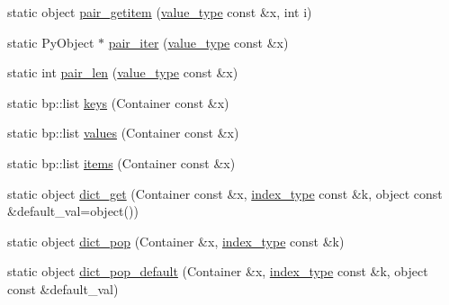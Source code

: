 \begin{DoxyCompactItemize}
\item 
static object \hyperlink{classboost_1_1python_1_1std__map__indexing__suite_a802d62d636e685954b7abe3331de7af6}{pair\-\_\-getitem} (\hyperlink{classboost_1_1python_1_1std__map__indexing__suite_aff9ed68cf30e805a04a313d92c62ab38}{value\-\_\-type} const \&x, int i)
\item 
static Py\-Object $\ast$ \hyperlink{classboost_1_1python_1_1std__map__indexing__suite_a09b84169bb3b2ceb9c576c41cd63280e}{pair\-\_\-iter} (\hyperlink{classboost_1_1python_1_1std__map__indexing__suite_aff9ed68cf30e805a04a313d92c62ab38}{value\-\_\-type} const \&x)
\item 
static int \hyperlink{classboost_1_1python_1_1std__map__indexing__suite_a639bbbf3265c0cab8419b106590c3857}{pair\-\_\-len} (\hyperlink{classboost_1_1python_1_1std__map__indexing__suite_aff9ed68cf30e805a04a313d92c62ab38}{value\-\_\-type} const \&x)
\item 
static bp\-::list \hyperlink{classboost_1_1python_1_1std__map__indexing__suite_a1d08ce35eb71bc9248f64a515d6d9775}{keys} (Container const \&x)
\item 
static bp\-::list \hyperlink{classboost_1_1python_1_1std__map__indexing__suite_a81c04a5902c3ea0b559b56ab66e600a9}{values} (Container const \&x)
\item 
static bp\-::list \hyperlink{classboost_1_1python_1_1std__map__indexing__suite_a6e44b3f64f0723b75c7e00b8d46bab92}{items} (Container const \&x)
\item 
static object \hyperlink{classboost_1_1python_1_1std__map__indexing__suite_a6012daef85763e30ed55ef753933ff1b}{dict\-\_\-get} (Container const \&x, \hyperlink{classboost_1_1python_1_1std__map__indexing__suite_a4b2ac75883fba93dbca6d9e83197c842}{index\-\_\-type} const \&k, object const \&default\-\_\-val=object())
\item 
static object \hyperlink{classboost_1_1python_1_1std__map__indexing__suite_a56d69ee32c136ed83389eefae5f8df3a}{dict\-\_\-pop} (Container \&x, \hyperlink{classboost_1_1python_1_1std__map__indexing__suite_a4b2ac75883fba93dbca6d9e83197c842}{index\-\_\-type} const \&k)
\item 
static object \hyperlink{classboost_1_1python_1_1std__map__indexing__suite_a923cb4bd1266dd53065eba4d3c91279a}{dict\-\_\-pop\-\_\-default} (Container \&x, \hyperlink{classboost_1_1python_1_1std__map__indexing__suite_a4b2ac75883fba93dbca6d9e83197c842}{index\-\_\-type} const \&k, object const \&default\-\_\-val)
\item 

\end{DoxyCompactItemize}
